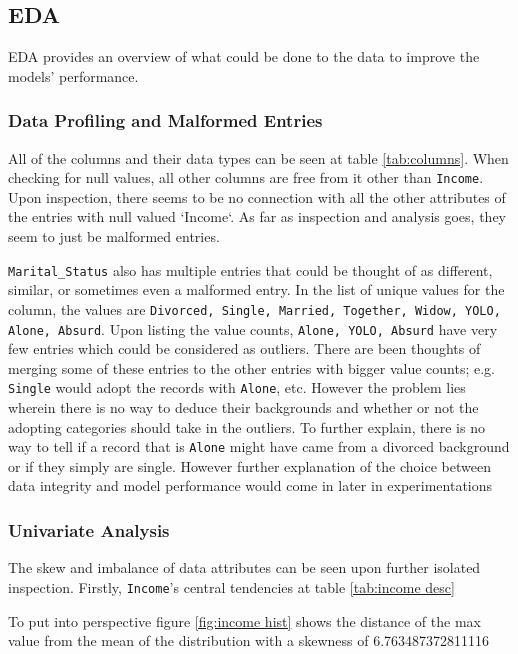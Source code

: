 \subsection{EDA}

EDA provides an overview of what could be done to the data to improve the models' performance. 

\subsubsection{Data Profiling and Malformed Entries}

All of the columns and their data types can be seen at table \ref{tab:columns}. When checking for null values, all other columns are free from it other than \texttt{Income}. Upon inspection, there seems to be no connection with all the other attributes of the entries with null valued `Income`. As far as inspection and analysis goes, they seem to just be malformed entries. 

\texttt{Marital\_Status} also has multiple entries that could be thought of as different, similar, or sometimes even a malformed entry. In the list of unique values for the column, the values are \texttt{Divorced, Single, Married, Together, Widow, YOLO, Alone, Absurd}. Upon listing the value counts, \texttt{Alone, YOLO, Absurd} have very few entries which could be considered as outliers. There are been thoughts of merging some of these entries to the other entries with bigger value counts; e.g. \texttt{Single} would adopt the records with \texttt{Alone}, etc. However the problem lies wherein there is no way to deduce their backgrounds and whether or not the adopting categories should take in the outliers. To further explain, there is no way to tell if a record that is \texttt{Alone} might have came from a divorced background or if they simply are single. However further explanation of the choice between data integrity and model performance would come in later in experimentations

\subsubsection{Univariate Analysis}

The skew and imbalance of data attributes can be seen upon further isolated inspection. Firstly, \texttt{Income}'s central tendencies at table \ref{tab:income desc}

To put into perspective figure \ref{fig:income hist} shows the distance of the max value from the mean of the distribution with a skewness of 6.763487372811116

